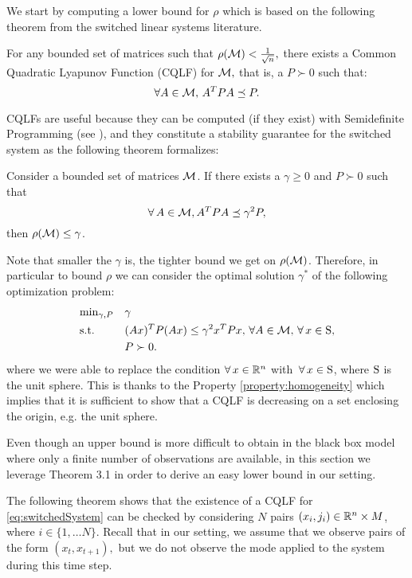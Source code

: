 We start by computing a lower bound for $\rho$ which is based on the following theorem from the switched linear systems literature.
\begin{theorem}\cite[Theorem 2.11]{jungers_lncis}\label{thm:john}
For any bounded set of matrices such that $\rho(\mathcal{M})<\frac{1}{\sqrt{n}},$ there exists a Common Quadratic Lyapunov Function (CQLF) for $\mathcal{M},$ that is, a $P\succ 0$ such that: $$\forall A\in \mathcal{M},\, A^TPA\preceq P. $$
\end{theorem}

CQLFs are useful because they can be computed (if they exist) with Semidefinite Programming (see \cite{boyd}), and they constitute a stability guarantee for the switched system as the following theorem formalizes:
\begin{theorem}\cite[Prop. 2.8]{jungers_lncis}\label{thm:cqlf} Consider a bounded set of matrices $\mathcal{M}$. If there exists a $\gamma \geq 0$ and $P \succ 0$ such that $$\forall\, A \in \mathcal{M}, A^TPA \preceq \gamma^2P,$$ then $\rho(\mathcal{M}) \leq \gamma$.
\end{theorem}
Note that smaller the $\gamma$ is, the tighter bound we get on $\rho(\mathcal{M})$. Therefore, in particular to bound $\rho$ we can consider the optimal solution $\gamma^*$ of the following optimization problem:
\begin{equation}\label{eqn:campiOpt0}
\begin{aligned}
& \text{min}_{\gamma, P} & & \gamma \\
& \text{s.t.} 
&  & (Ax)^TP(Ax) \leq \gamma^2 x^TPx,\,\forall A \in \mathcal{M}, \,\forall\, x \in \text{S},\\
& && P \succ 0. \\
\end{aligned}
\end{equation}
where we were able to replace the condition $\forall\,x \in \mathbb{R}^n$ with $\,\forall\, x \in \text{S}$, where $\text{S}$ is the unit sphere. This is thanks to the Property \ref{property:homogeneity} which implies that it is sufficient to show that a CQLF is decreasing on a set enclosing the origin, e.g. the unit sphere. 

Even though an upper bound is more difficult to obtain in the black box model where only a finite number of observations are available, in this section we leverage Theorem 3.1 in order to derive an easy lower bound in our setting.

The following theorem shows that the existence of a CQLF for \eqref{eq:switchedSystem} can be checked by considering $N$ pairs $(x_i, j_i) \in \mathbb{R}^n \times M$, where $i \in \{1, \ldots N\}.$ Recall that in our setting, we assume that we observe pairs of the form $(x_t,x_{t+1}),$ but we do not observe the mode applied to the system during this time step.
%

